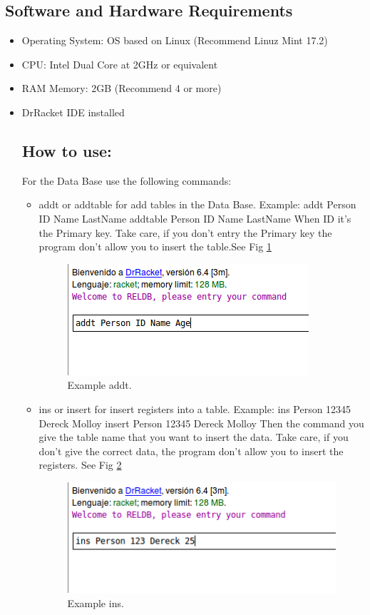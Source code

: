 \documentclass[12pt]{article}
\begin{document}
\subsection{Software and Hardware Requirements}
\begin{itemize}
\item Operating System: OS based on Linux (Recommend Linuz Mint 17.2)
\item CPU: Intel Dual Core at 2GHz or equivalent
\item RAM Memory: 2GB (Recommend 4 or more) 
\item DrRacket IDE installed

\subsection{How to use:}
For the Data Base use the following commands:
\begin{itemize}
\item addt or addtable for add tables in the Data Base. Example:\newline
addt Person ID Name LastName\newline
addtable Person ID Name LastName\newline
When ID it's the Primary key. Take care, if you don't entry the Primary key the program don't allow you to insert the table.See Fig \ref{addt}
\begin{figure}[h!]
 	\centering
  	\includegraphics[scale=0.5]
  	{Images/1.png}
  	\caption{Example addt.}
     \label{addt}
\end{figure}
\item ins or insert for insert registers into a table. Example: \newline 
ins Person 12345 Dereck Molloy \newline
insert Person 12345 Dereck Molloy \newline
Then the command you give the table name that you want to insert the data. Take care, if you don't give the correct data, the program don't allow you to insert the registers. See Fig \ref{ins}
\begin{figure}[h!]
 	\centering
  	\includegraphics[scale=0.5]
  	{Images/2.png}
  	\caption{Example ins.}
     \label{ins}
\end{figure}


\end{itemize}
\end{itemize}
\end{document}
